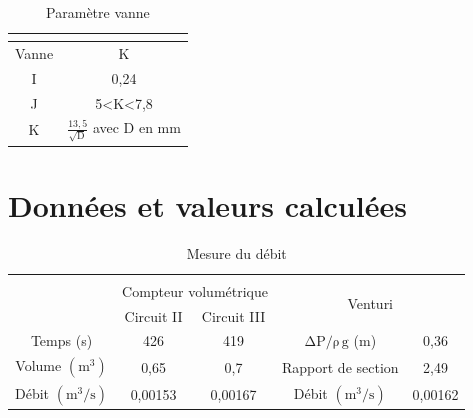 \documentclass[12pt, a4paper, twoside]{article} %
\renewcommand{\r}{\right)}
\renewcommand{\l}{\left(}
\begin{document}
\begin{table}[H]
    \centering
     \caption{Paramètre vanne}
    \begin{tabular}{|c|c|}
     \multicolumn{2}{c}{ } \\
    \hline 
        Vanne & K \\
        \hline 
        I & 0,24 \\ 
        \hline 
        J & 5<K<7,8 \\ 
        \hline 
        K & $\frac{13,5}{\sqrt{\mathrm{D}}}$ avec D en mm \\
        \hline
    \end{tabular}
    \label{tab:vanne}
\end{table}

\clearpage
\section{Données et valeurs calculées}
\label{Annexe:Données et valeurs calculer}

\begin{table}[h]
    \centering
    \caption{Mesure du débit}
    \label{tab:mesure_débit}
    \begin{tabular}{|c|c|c|c|c|}
    \multicolumn{4}{c}{ } \\ 
    \cline{2-5}
    \multicolumn{1}{c}{ }  & \multicolumn{2}{|c|}{Compteur volumétrique} & \multicolumn{2}{c|}{\multirow{2}{*}{Venturi}} \\
    \cline{2-3}
    \multicolumn{1}{c|}{ }  & Circuit II & Circuit III & \multicolumn{2}{c|}{ }   \\ %
    \hline
    Temps (s)  & 426 & 419 & $\mathrm{\Delta P/ \rho \,g}$ (m) & 0,36 \\
    \hline
    Volume $\l \mathrm{m^3} \r$ & 0,65 & 0,7 & Rapport de section & 2,49 \\ 
     \hline
    Débit $\l \mathrm{m^3/s} \r$ & 0,00153 & 0,00167 & Débit $\l \mathrm{m^3/s} \r$ & 0,00162 \\
    \hline
    \end{tabular}
\end{table}
\end{document}
